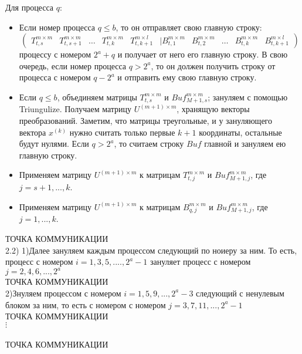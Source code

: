 \documentclass[a4paper,12pt]{article}
\begin{document}
Для процесса $q$: 
\begin{itemize}
  \item Если номер процесса $q \leq b$, то он отправляет свою главную строку:
  \[
  \begin{pmatrix}
  T_{t,s}^{m \times m} & T_{t,s+1}^{m \times m} & \dots & T_{t,k}^{m \times m} & T_{t,k+1}^{m \times l} & | B_{t,1}^{m \times m} & B_{t,2}^{m \times m} & \dots & B_{t,k}^{m\times m} & B_{t,k+1}^{m \times l}
  \end{pmatrix}
  \]
  процессу с номером $2^{a} + q$ и получает от него его главную строку. В свою очередь, если номер процесса $q > 2^{a}$, то он должен получить строку от процесса с номером $q - 2^{a}$ и отправить ему свою главную строку.

  \item Если $q \leq b$, объединяем матрицы $T_{t,s}^{m \times m}$ и $Buf_{M+1,s}^{m \times m}$; зануляем с помощью Triungulize. Получаем матрицу $U^{(m+1) \times m}$, хранящую векторы преобразований. Заметим, что матрицы треугольные, и у зануляющего вектора $x^{(k)}$ нужно считать только первые $k+1$ координаты, остальные будут нулями. Если $q > 2^{a}$, то считаем строку $Buf$ главной и зануляем ею главную строку.

  \item Применяем матрицу $U^{(m+1) \times m}$ к матрицам $T_{t,j}^{m \times m}$ и $Buf_{M+1,j}^{m \times m}$, где $j = s+1,...,k$.

  \item Применяем матрицу $U^{(m+1) \times m}$ к матрицам $B_{q,j}^{m \times m}$ и $Buf_{M+1,j}^{m \times m}$, где $j = 1,...,k$.
\end{itemize}
{\fontsize{10}{10}\selectfont ТОЧКА КОММУНИКАЦИИ}\\
2.2) 1)Далее зануляем каждым процессом следующий по ноиеру за ним. То есть, процесс с номером $i= 1,3,5,....,2^{a}-1$ зануляет процесс с номером $j = 2,4,6,...,2^{a}$ \\
{\fontsize{10}{10}\selectfont ТОЧКА КОММУНИКАЦИИ}\\
2)Знуляем процессом с номером $i = 1,5,9,...,2^{a}-3$ следующий с ненулевым блоком за ним, то есть с номером с номером $j = 3,7,11,...,2^{a}-1$\\
{\fontsize{10}{10}\selectfont ТОЧКА КОММУНИКАЦИИ}\\
$\vdots$\\\\
{\fontsize{10}{10}\selectfont ТОЧКА КОММУНИКАЦИИ}\\
\end{document}
